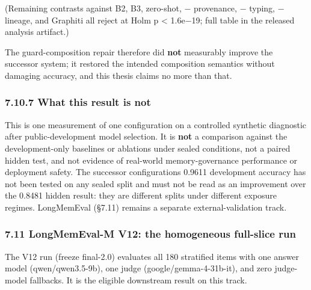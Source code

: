 (Remaining contrasts against B2, B3, zero-shot, − provenance, − typing,
− lineage, and Graphiti all reject at Holm p \textless{} 1.6e−19; full
table in the released analysis artifact.)

The guard-composition repair therefore did \textbf{not} measurably
improve the successor system; it restored the intended composition
semantics without damaging accuracy, and this thesis claims no more than
that.

\subsubsection{7.10.7 What this result is
not}\label{what-this-result-is-not}

This is one measurement of one configuration on a controlled synthetic
diagnostic after public-development model selection. It is \textbf{not}
a comparison against the development-only baselines or ablations under
sealed conditions, not a paired hidden test, and not evidence of
real-world memory-governance performance or deployment safety. The
successor configuration\textquotesingle s 0.9611 development accuracy
has not been tested on any sealed split and must not be read as an
improvement over the 0.8481 hidden result: they are different splits
under different exposure regimes. LongMemEval (§7.11) remains a separate
external-validation track.

\subsubsection{7.11 LongMemEval-M V12: the homogeneous full-slice
run}\label{longmemeval-m-v12-the-homogeneous-full-slice-run}

The V12 run (freeze final-2.0) evaluates all 180 stratified items with
one answer model (qwen/qwen3.5-9b), one judge (google/gemma-4-31b-it),
and zero judge-model fallbacks. It is the eligible downstream result on
this track.

